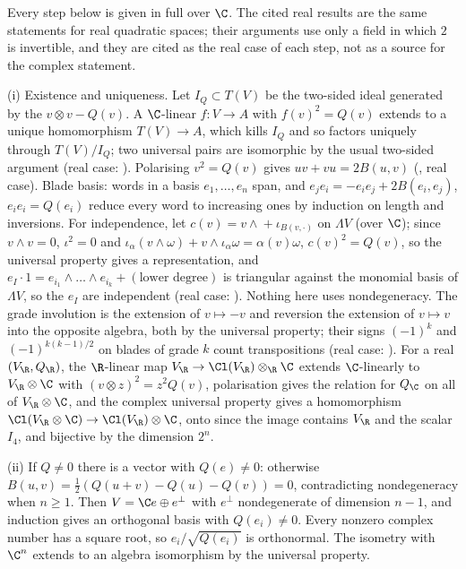 Every step below is given in full over $\C$. The cited real results are the same statements for real quadratic spaces; their arguments use only a field in which $2$ is invertible, and they are cited as the real case of each step, not as a source for the complex statement.

(i) Existence and uniqueness. Let $I_Q \subset T(V)$ be the two-sided ideal generated by the $v \otimes v - Q(v)$. A $\C$-linear $f : V \to A$ with $f(v)^{2} = Q(v)$ extends to a unique homomorphism $T(V) \to A$, which kills $I_Q$ and so factors uniquely through $T(V)/I_Q$; two universal pairs are isomorphic by the usual two-sided argument (real case: ). Polarising $v^{2} = Q(v)$ gives $uv + vu = 2B(u, v)$ (, real case). Blade basis: words in a basis $e_1, \dots, e_n$ span, and $e_j e_i = -e_i e_j + 2B(e_i, e_j)$, $e_i e_i = Q(e_i)$ reduce every word to increasing ones by induction on length and inversions. For independence, let $c(v) = v \wedge{} + \iota_{B(v, \cdot)}$ on $\Lambda V$ (over $\C$); since $v \wedge v = 0$, $\iota^{2} = 0$ and $\iota_\alpha(v \wedge \omega) + v \wedge \iota_\alpha \omega = \alpha(v)\omega$, $c(v)^{2} = Q(v)$, so the universal property gives a representation, and $e_I \cdot 1 = e_{i_1} \wedge \dots \wedge e_{i_k} + (\text{lower degree})$ is triangular against the monomial basis of $\Lambda V$, so the $e_I$ are independent (real case: ). Nothing here uses nondegeneracy. The grade involution is the extension of $v \mapsto -v$ and reversion the extension of $v \mapsto v$ into the opposite algebra, both by the universal property; their signs $(-1)^{k}$ and $(-1)^{k(k-1)/2}$ on blades of grade $k$ count transpositions (real case: ). For a real $(V_\R, Q_\R)$, the $\R$-linear map $V_\R \to \Cl(V_\R) \otimes_\R \C$ extends $\C$-linearly to $V_\R \otimes \C$ with $(v \otimes z)^{2} = z^{2}Q(v)$, polarisation gives the relation for $Q_\C$ on all of $V_\R \otimes \C$, and the complex universal property gives a homomorphism $\Cl(V_\R \otimes \C) \to \Cl(V_\R) \otimes \C$, onto since the image contains $V_\R$ and the scalar $I_4$, and bijective by the dimension $2^{n}$.

(ii) If $Q \ne 0$ there is a vector with $Q(e) \ne 0$: otherwise $B(u, v) = \tfrac12(Q(u + v) - Q(u) - Q(v)) = 0$, contradicting nondegeneracy when $n \ge 1$. Then $V = \C e \oplus e^{\perp}$ with $e^{\perp}$ nondegenerate of dimension $n - 1$, and induction gives an orthogonal basis with $Q(e_i) \ne 0$. Every nonzero complex number has a square root, so $e_i / \sqrt{Q(e_i)}$ is orthonormal. The isometry with $\C^{n}$ extends to an algebra isomorphism by the universal property.


